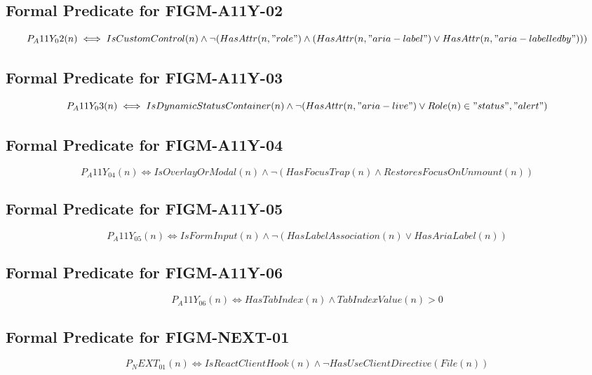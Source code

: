 \subsection{Formal Predicate for FIGM-A11Y-02}
\begin{equation}
P_A11Y_02(n) \iff IsCustomControl(n) \land \neg (HasAttr(n, "role") \land (HasAttr(n, "aria-label") \lor HasAttr(n, "aria-labelledby")))
\end{equation}

\subsection{Formal Predicate for FIGM-A11Y-03}
\begin{equation}
P_A11Y_03(n) \iff IsDynamicStatusContainer(n) \land \neg (HasAttr(n, "aria-live") \lor Role(n) \in {"status", "alert"})
\end{equation}

\subsection{Formal Predicate for FIGM-A11Y-04}
\begin{equation}
P_A11Y_04(n) \iff IsOverlayOrModal(n) \land \neg (HasFocusTrap(n) \land RestoresFocusOnUnmount(n))
\end{equation}

\subsection{Formal Predicate for FIGM-A11Y-05}
\begin{equation}
P_A11Y_05(n) \iff IsFormInput(n) \land \neg (HasLabelAssociation(n) \lor HasAriaLabel(n))
\end{equation}

\subsection{Formal Predicate for FIGM-A11Y-06}
\begin{equation}
P_A11Y_06(n) \iff HasTabIndex(n) \land TabIndexValue(n) > 0
\end{equation}

\subsection{Formal Predicate for FIGM-NEXT-01}
\begin{equation}
P_NEXT_01(n) \iff IsReactClientHook(n) \land \neg HasUseClientDirective(File(n))
\end{equation}

